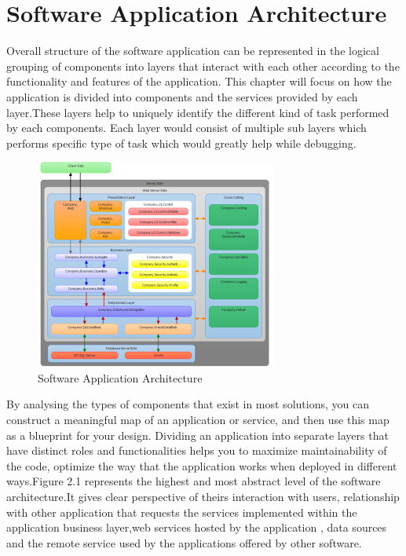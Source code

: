 \chapter{Software Application Architecture}\label{ch:ch2label}
						
						Overall structure of the software application can be represented in the logical grouping of components into layers that interact with each other according to the functionality and features of the application. This chapter will focus on how the application is divided into components and the services provided by each layer.These layers help to uniquely identify the different kind of task performed by each components. Each layer would consist of multiple sub layers which performs specific type of task which would greatly help while debugging.

\begin{figure}[!htb]
  \includegraphics[width=\linewidth]{figures/SwArch.png}
	 \caption{Software Application Architecture}
  \label{fig: Software Application Architecture}
\end{figure}						
					
						By analysing the types of components that exist in most solutions, you can construct a meaningful map of an application or service, and then use this map as a blueprint for your design. Dividing an application into separate layers that have distinct roles and functionalities helps you to maximize maintainability of the code, optimize the way that the application works when deployed in different ways.Figure 2.1 represents the highest and most abstract level of the software architecture.It gives clear perspective of theirs interaction with users, relationship with other application that requests the services implemented within the application business layer,web services hosted by the application , data sources and the remote service used by the applications offered by other software.

